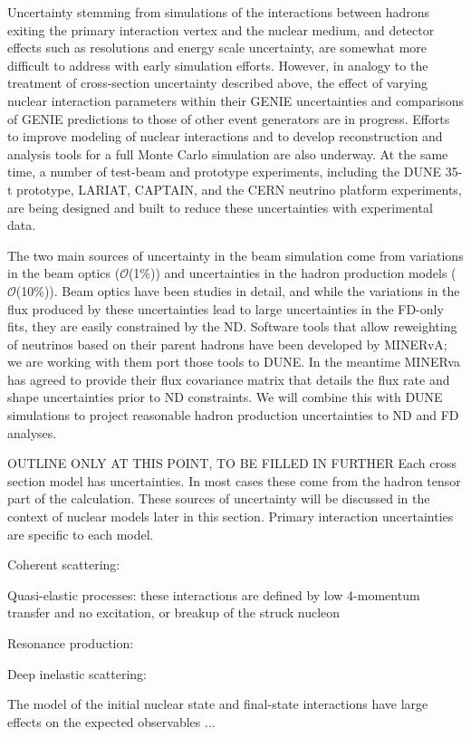 Uncertainty stemming from simulations of the interactions between hadrons
exiting the primary interaction vertex and the nuclear medium, and detector effects
such as resolutions and energy scale uncertainty, are somewhat more difficult to address with early
simulation efforts. However, in analogy to the treatment of cross-section uncertainty described above,
the effect of varying nuclear interaction parameters within their GENIE
uncertainties and comparisons of GENIE predictions to those of other
event generators are in progress.
Efforts to improve modeling of nuclear interactions and to develop 
reconstruction and analysis tools for a full Monte Carlo simulation are also underway. 
At the same time,
a number of test-beam and prototype experiments, including the DUNE 35-t prototype,
LARIAT, CAPTAIN, and the CERN neutrino platform experiments, are being designed and built to reduce these
uncertainties with experimental data.

The two main sources of uncertainty in the beam simulation come from variations in the beam optics
($\mathcal{O}$(1\%)) and uncertainties in the hadron production models ($\mathcal{O}$(10\%)).
Beam optics have been studies in detail, and while the variations in the flux produced by these uncertainties
lead to large uncertainties in the FD-only fits, they are easily constrained by the ND. Software tools that
allow reweighting of neutrinos based on their parent hadrons have been developed by MINERvA; we are working with
them port those tools to DUNE. In the meantime MINERva has agreed to provide their flux covariance matrix
that details the flux rate and shape uncertainties prior to ND constraints. We will combine this with DUNE
simulations to project reasonable hadron production uncertainties to ND and FD analyses.

OUTLINE ONLY AT THIS POINT, TO BE FILLED IN FURTHER
Each cross section model has uncertainties. In most cases these come from the hadron tensor part of the
calculation. These sources of uncertainty will be discussed in the context of nuclear models later in this
section. Primary interaction uncertainties are specific to each model.

  Coherent scattering:

  Quasi-elastic processes: these interactions are defined by low 4-momentum transfer and no excitation,
    or breakup of the struck nucleon

  Resonance production:

  Deep inelastic scattering:

The model of the initial nuclear state and final-state interactions have large effects on the
expected observables ...
